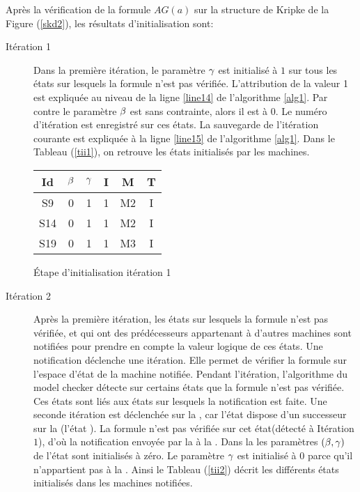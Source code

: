 \begin{Exemple}\label{ea1}
	Après la vérification de la formule \textit{$AG(a)$} sur la structure de Kripke de la Figure (\ref{skd2}), les résultats d'initialisation sont:
\begin{description}
	\item[Itération 1]				
Dans la première itération, le paramètre $\gamma{}$ est initialisé à $1$ sur tous les états sur lesquels la formule n'est pas vérifiée. L'attribution de la valeur 1 est expliquée au niveau de la ligne \ref{line14} de l'algorithme \ref{alg1}. Par contre le paramètre $\beta{}$ est sans contrainte, alors il est à $0$. Le numéro  d'itération est enregistré sur ces états. La sauvegarde de l'itération courante est expliquée à la ligne \ref{line15} de l'algorithme \ref{alg1}.
Dans le Tableau (\ref{tii1}), on retrouve les états initialisés par les machines.   
\begin{tableth}
	\centering
	\begin{tabular}{|*{6}{c|}}
		\hline
		Id	& $\beta{}$	&$\gamma{}$&	I&	M&	T\\
		\hline
		S9	&0	&1	&1	&M2	&I\\
		\hline
		S14	&0	&1	&1	&M2	&I\\
		\hline
		S19	&0	&1	&1	&M3	&I\\
		\hline
	\end{tabular}
	\caption{Étape d'initialisation itération 1}\label{tii1}
\end{tableth}	

	\item[Itération 2]				
Après la première itération, les états sur lesquels la formule n'est pas vérifiée, et qui ont des prédécesseurs appartenant à d'autres machines sont notifiées pour prendre en compte la valeur logique de ces états. Une notification déclenche une itération. Elle permet de vérifier la formule sur l'espace d'état de la machine notifiée. Pendant l'itération, l'algorithme du model checker détecte sur certains états que la formule n'est pas vérifiée. Ces états sont liés aux états sur lesquels la notification est faite.
Une seconde itération est déclenchée sur la \mone{}, car l'état  dispose d'un successeur sur la \mtwo{} (l'état ). La formule n'est pas vérifiée sur cet état(détecté à Itération $1$), d'où la notification envoyée par la \mtwo{} à la \mone{}. Dans la \mone{} les paramètres $(\beta{}, \gamma{})$ de l'état  sont initialisés à zéro. Le paramètre $\gamma{}$ est initialisé à $0$  parce qu'il n'appartient pas à la \mtwo{}. Ainsi le Tableau (\ref{tii2}) décrit les différents états initialisés dans les machines notifiées.
      

\end{description}
\end{Exemple}
